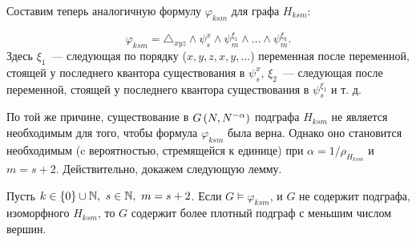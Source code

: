 Составим теперь аналогичную формулу $\varphi_{ksm}$ для графа $H_{ksm}$:

\[ \varphi_{ksm} =  \triangle_{xyz} \wedge \psi_{s}^{x} \wedge \psi_{m}^{\xi_1} \wedge \ldots \wedge \psi_{m}^{\xi_{k}} .\]
Здесь $\xi_1$~--- следующая по порядку ($x,y,z,x,y,\ldots$) переменная после переменной, стоящей у последнего квантора существования в $\psi^x_s$, $\xi_2$~--- следующая после переменной, стоящей у последнего квантора существования в $\psi^{\xi_1}_s$ и т. д.




По той же причине, существование в $G\left(N,N^{-\alpha}\right)$ подграфа $H_{ksm}$ не является необходимым для того, чтобы формула $\varphi_{ksm}$ была верна.
Однако оно становится необходимым (c вероятностью, стремящейся к единице) при $\alpha = 1/\rho_{H_{ksm}}$ и $m = s+2$. 
Действительно, докажем следующую лемму.

\begin{Lem} 
\label{lem:min_ro_Hksm}
Пусть $k \in \{0\} \cup \mathbb {N},~s \in \mathbb {N},~ m=s+2$. Если $G \vDash \varphi_{ksm}$, и $G$ не содержит подграфа, изоморфного $H_{ksm}$, то $G$ содержит более плотный подграф с меньшим числом вершин.
\end{Lem}


